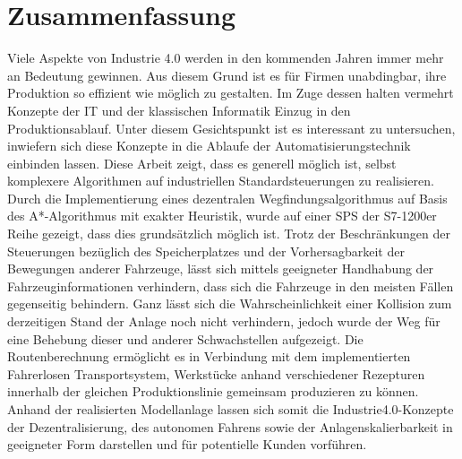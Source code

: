 \section{Zusammenfassung}
	
	Viele Aspekte von Industrie 4.0 werden in den kommenden Jahren immer mehr an Bedeutung gewinnen. Aus diesem Grund ist es für Firmen unabdingbar, ihre Produktion so effizient wie möglich zu gestalten. Im Zuge dessen halten vermehrt Konzepte der IT und der klassischen Informatik Einzug in den Produktionsablauf. Unter diesem Gesichtspunkt ist es interessant zu untersuchen, inwiefern sich diese Konzepte in die Ablaufe der Automatisierungstechnik einbinden lassen. Diese Arbeit zeigt, dass es generell möglich ist, selbst komplexere Algorithmen auf industriellen Standardsteuerungen zu realisieren. Durch die Implementierung eines dezentralen Wegfindungsalgorithmus auf Basis des A*-Algorithmus mit exakter Heuristik, wurde auf einer \ac{SPS} der S7-1200er Reihe gezeigt, dass dies grundsätzlich möglich ist. Trotz der Beschränkungen der Steuerungen bezüglich des Speicherplatzes und der Vorhersagbarkeit der Bewegungen anderer Fahrzeuge, lässt sich mittels geeigneter Handhabung der Fahrzeuginformationen verhindern, dass sich die Fahrzeuge in den meisten Fällen gegenseitig behindern. Ganz lässt sich die Wahrscheinlichkeit einer Kollision zum derzeitigen Stand der Anlage noch nicht verhindern, jedoch wurde der Weg für eine Behebung dieser und anderer Schwachstellen aufgezeigt. Die Routenberechnung ermöglicht es in Verbindung mit dem implementierten Fahrerlosen Transportsystem, Werkstücke anhand verschiedener Rezepturen innerhalb der gleichen Produktionslinie gemeinsam produzieren zu können. Anhand der realisierten Modellanlage lassen sich somit die Industrie4.0-Konzepte der Dezentralisierung, des autonomen Fahrens sowie der Anlagenskalierbarkeit in geeigneter Form darstellen und für potentielle Kunden vorführen.
	
	